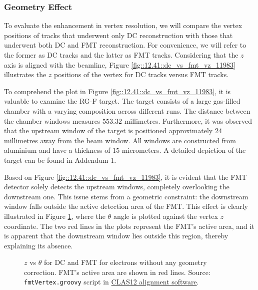 \subsubsection{Geometry Effect}
\label{12.42::geometry_effect}
    To evaluate the enhancement in vertex resolution, we will compare the vertex positions of tracks that underwent only DC reconstruction with those that underwent both DC and FMT reconstruction.
    For convenience, we will refer to the former as DC tracks and the latter as FMT tracks.
    Considering that the $z$ axis is aligned with the beamline, Figure \ref{fig::12.41::dc_vs_fmt_vz_11983} illustrates the $z$ positions of the vertex for DC tracks versus FMT tracks.

    To comprehend the plot in Figure \ref{fig::12.41::dc_vs_fmt_vz_11983}, it is valuable to examine the RG-F target.
    The target consists of a large gas-filled chamber with a varying composition across different runs.
    The distance between the chamber windows measures $553.32$ millimetres.
    Furthermore, it was observed that the upstream window of the target is positioned approximately $24$ millimetres away from the beam window.
    All windows are constructed from aluminium and have a thickness of $15$ micrometers.
    A detailed depiction of the target can be found in Addendum 1.

    Based on Figure \ref{fig::12.41::dc_vs_fmt_vz_11983}, it is evident that the FMT detector solely detects the upstream windows, completely overlooking the downstream one.
    This issue stems from a geometric constraint: the downstream window falls outside the active detection area of the FMT.
    This effect is clearly illustrated in Figure \ref{eq::12.42::vz_vs_theta}, where the $\theta$ angle is plotted against the vertex $z$ coordinate.
    The two red lines in the plots represent the FMT's active area, and it is apparent that the downstream window lies outside this region, thereby explaining its absence.

    \begin{figure}[t!]
        \centering{}
        \caption[$z$ vs $\theta$ for DC and FMT.]{$z$ vs $\theta$ for DC and FMT for electrons without any geometry correction. FMT's active area are shown in red lines.
        Source: \texttt{fmtVertex.groovy} script in \href{https://github.com/JeffersonLab/clas12alignment}{CLAS12 alignment software}.}
        \label{eq::12.42::vz_vs_theta}
    \end{figure}

